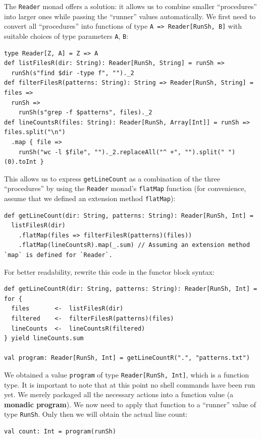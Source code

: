 The \lstinline!Reader! monad offers a solution: it allows us to combine
smaller \textsf{``}procedures\textsf{''} into larger ones while passing the \textsf{``}runner\textsf{''}
values automatically. We first need to convert all \textsf{``}procedures\textsf{''}
into functions of type \lstinline!A => Reader[RunSh, B]! with suitable
choices of type parameters \lstinline!A!, \lstinline!B!:
\begin{lstlisting}
type Reader[Z, A] = Z => A
def listFilesR(dir: String): Reader[RunSh, String] = runSh =>
  runSh(s"find $dir -type f", "")._2
def filterFilesR(patterns: String): String => Reader[RunSh, String] = files =>
  runSh =>
    runSh(s"grep -f $patterns", files)._2
def lineCountsR(files: String): Reader[RunSh, Array[Int]] = runSh => files.split("\n")
  .map { file =>
    runSh("wc -l $file", "")._2.replaceAll("^ +", "").split(" ")(0).toInt }
\end{lstlisting}
 This allows us to express \lstinline!getLineCount! as a combination
of the three \textsf{``}procedures\textsf{''} by using the \lstinline!Reader! monad\textsf{'}s
\lstinline!flatMap! function (for convenience, assume that we defined
an extension method \lstinline!flatMap!):
\begin{lstlisting}
def getLineCount(dir: String, patterns: String): Reader[RunSh, Int] =
  listFilesR(dir)
    .flatMap(files => filterFilesR(patterns)(files))
    .flatMap(lineCountsR).map(_.sum) // Assuming an extension method `map` is defined for `Reader`.
\end{lstlisting}
For better readability, rewrite this code in the functor block syntax:
\begin{lstlisting}
def getLineCountR(dir: String, patterns: String): Reader[RunSh, Int] = for {
  files       <-  listFilesR(dir)
  filtered    <-  filterFilesR(patterns)(files)
  lineCounts  <-  lineCountsR(filtered)
} yield lineCounts.sum

val program: Reader[RunSh, Int] = getLineCountR(".", "patterns.txt") 
\end{lstlisting}
We obtained a value \lstinline!program! of type \lstinline!Reader[RunSh, Int]!,
which is a function type. It is important to note that at this point
no shell commands have been run yet. We merely packaged all the necessary
actions into a function value (a \textbf{monadic program}).
We now need to apply that function to a \textsf{``}runner\textsf{''}
value of type \lstinline!RunSh!. Only then we will obtain the actual
line count:
\begin{lstlisting}
val count: Int = program(runSh)
\end{lstlisting}


